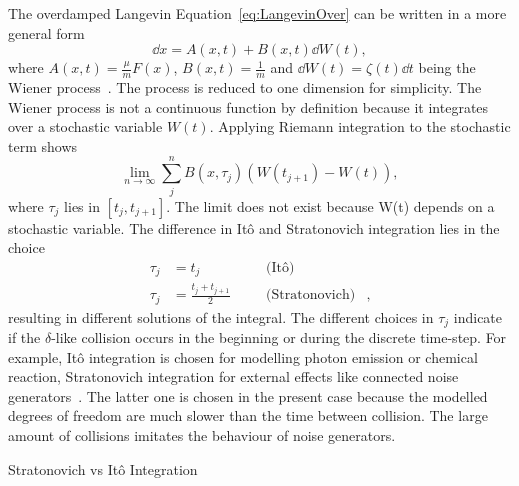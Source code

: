 \begin{Technical Point}[t]
  The overdamped Langevin Equation~\ref{eq:LangevinOver} can be written in a more general form
  \begin{equation}
   \dd{x} = A(x,t) + B(x,t) \dd{W(t)}, 
  \end{equation}
  where $A(x,t) =\frac{\mu}{m}F(x)$, $B(x,t)= \frac{1}{m}$ and $\dd{W(t)} = \zeta(t) \dd{t}$ being the Wiener process~\cite{van1992stochastic}. The process is reduced to one dimension for simplicity.  The Wiener process is not a continuous function by definition because it integrates over a stochastic variable $W(t)$. Applying Riemann integration to the stochastic term shows
  \begin{equation}
   \lim \limits_{n \to \infty} \sum_j^n B(x,\tau_j) (W(t_{j+1}) -W(t)) ,
  \end{equation}
  where $\tau_j$ lies in $[t_j,t_{j+1}]$. The limit does not exist because W(t) depends on a stochastic variable. The difference in It\^{o} and Stratonovich integration lies in the choice
  \begin{equation}
   \begin{aligned}
    \tau_j &= t_j \;\;\;\;\;\;\;\;\;\;\;\;\;\; &\text{(It\^{o})}&\\
    \tau_j &= \frac{t_j + t_{j+1}}{2}\; & \text{(Stratonovich)}& ,
    \end{aligned}
  \end{equation}
  resulting in different solutions of the integral. The different choices in  $\tau_j$ indicate if the $\delta$-like collision occurs in the beginning or during the discrete time-step. For example, It\^{o} integration is chosen for modelling photon emission or chemical reaction, Stratonovich integration for external effects like connected noise generators~\cite{van1992stochastic}. The latter one is chosen in the present case because the modelled degrees of freedom are much slower than the time between collision. The large amount of collisions imitates the behaviour of noise generators.
  \caption{Stratonovich vs It\^{o} Integration}\label{tec:Strat}
\end{Technical Point}



